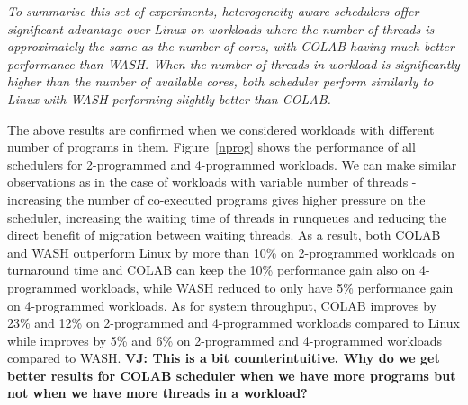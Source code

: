 \emph{To summarise this set of experiments, heterogeneity-aware schedulers offer significant advantage over Linux on workloads where the number of threads is approximately the same as the number of cores, with COLAB having much better performance than WASH. When the number of threads in workload is significantly higher than the number of available cores, both scheduler perform similarly to Linux with WASH performing slightly better than COLAB.}

The above results are confirmed when we considered workloads with different number of programs in them. Figure~\ref{nprog} shows the performance of all schedulers for 2-programmed and 4-programmed workloads. We can make similar observations as in the case of workloads with variable number of threads - increasing the number of co-executed programs gives higher pressure on the scheduler, increasing the waiting time of threads in runqueues and reducing the direct benefit of migration between waiting threads.
As a result, both COLAB and WASH outperform Linux by more than 10\% on 2-programmed workloads on turnaround time and COLAB can keep the 10\% performance gain also on 4-programmed workloads, while WASH reduced to only have 5\% performance gain on 4-programmed workloads. As for system throughput, COLAB improves by 23\% and 12\% on 2-programmed and 4-programmed workloads compared to Linux while improves by 5\% and 6\% on 2-programmed and 4-programmed workloads compared to WASH. \textbf{VJ: This is a bit counterintuitive. Why do we get better results for COLAB scheduler when we have more programs but not when we have more threads in a workload?}



